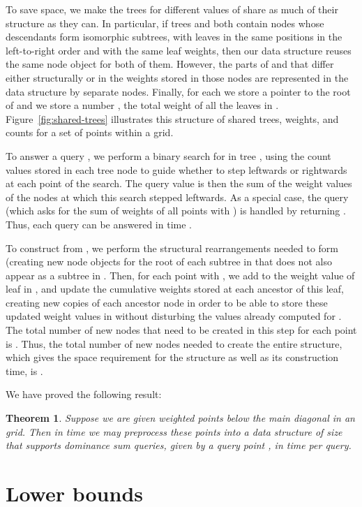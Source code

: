 \documentclass[11pt]{article}
\newtheorem{theorem}{Theorem}
\begin{document}
To save space, we make the trees  for different values of  share as much of their structure as they can. In particular, if trees  and  both contain nodes whose descendants form isomorphic subtrees, with leaves in the same positions in the left-to-right order and with the same leaf weights, then our data structure reuses the same node object for both of them. However, the parts of  and  that differ either structurally or in the weights stored in those nodes are represented in the data structure by separate nodes. Finally, for each  we store a pointer to the root of  and we store a number , the total weight of all the leaves in . Figure~\ref{fig:shared-trees} illustrates this structure of shared trees, weights, and counts for a set of points within a  grid.

To answer a query , we perform a binary search for  in tree , using the count values stored in each tree node to guide whether to step leftwards or rightwards at each point of the search. The query value is then the sum of the weight values of the nodes at which this search stepped leftwards. As a special case, the query  (which asks for the sum of weights of all points with ) is handled by returning . Thus, each query can be answered in time .

To construct  from , we perform the structural rearrangements needed to form  (creating new node objects for the root of each subtree in  that does not also appear as a subtree in . Then, for each point  with , we add  to the weight value of leaf  in , and update the cumulative weights stored at each ancestor of this leaf, creating new copies of each ancestor node in order to be able to store these updated weight values in  without disturbing the values already computed for . The total number of new nodes that need to be created in this step for each point  is .
Thus, the total number of new nodes needed to create the entire structure, which gives the space requirement for the structure as well as its construction time, is .

We have proved the following result:

\begin{theorem}
Suppose we are given  weighted points below the main diagonal in an  grid. Then in time  we may preprocess these points into a data structure of size  that supports dominance sum queries, given by a query point , in time  per query.
\end{theorem}

\section{Lower bounds}
\label{sec:lb}
\end{document}

